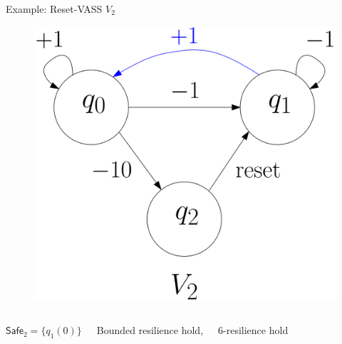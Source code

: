 \documentclass{beamer}
\newcommand{\Safe}{\textsf{Safe}}
\begin{document}
  \begin{frame}{Example: Reset-VASS $V_2$}
  
  
   \begin{center}
 	\begin{figure}
\includegraphics[width=.4\textwidth]{FigB}
	\end{figure}
\end{center}  

\begin{columns}[T]

$\Safe_2 = \{q_1(0)\} $

 
 Bounded resilience hold, 
 
 \vspace{0.1cm}
 
 \phantom{bla} $6$-resilience hold

\end{columns}

 \vspace{0.25cm}
 


  \end{frame}
\end{document}
